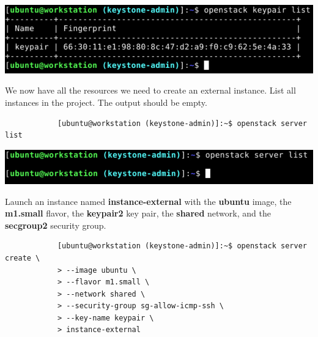 \documentclass[letterpaper, 12pt]{article}
\begin{document}
\begin{enumerate}
\begin{labstep}
        \begin{center}
            \includegraphics[width=\linewidth]{images/part5/step32.png}
        \end{center}
    \end{labstep}

    \begin{labstep}
        We now have all the resources we need to create an external instance.
        List all instances in the project.
        The output should be empty.
        \begin{lstlisting}
            [ubuntu@workstation (keystone-admin)]:~$ openstack server list
        \end{lstlisting}

        \begin{center}
            \includegraphics[width=\linewidth]{images/part5/step33.png}
        \end{center}
    \end{labstep}

    \begin{labstep}
        Launch an instance named \textbf{instance-external} with the \textbf{ubuntu} image, the \textbf{m1.small} flavor, the \textbf{keypair2} key pair, the \textbf{shared} network, and the \textbf{secgroup2} security group.
        \begin{lstlisting}
            [ubuntu@workstation (keystone-admin)]:~$ openstack server create \
            > --image ubuntu \
            > --flavor m1.small \
            > --network shared \
            > --security-group sg-allow-icmp-ssh \
            > --key-name keypair \
            > instance-external
        \end{lstlisting}


\end{labstep}
\end{enumerate}
\end{document}
